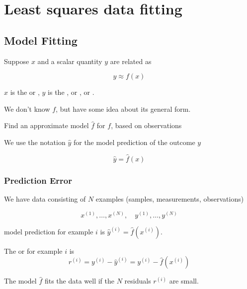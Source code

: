 \chapter{Least squares data fitting}

\section{Model Fitting}

\begin{problem}
  Suppose $ x $ and a scalar quantity $ y $ are related as

$$
y \approx f(x)
$$

$ x $ is the  or , $ y $ is the , or , or .

We don't know $ f $, but have some idea about its general form.

\end{problem}

\begin{definition}
    Find an approximate model $ \hat{f} $ for $ f $, based on observations

    We use the notation $ \hat{y} $ for the model prediction of the outcome $ y $

    $$
    \hat{y}=\hat{f}(x)
    $$
\end{definition}


\subsection{Prediction Error}

We have data consisting of $ N $ examples (samples, measurements, observations)

$$
x^{(1)}, \ldots, x^{(N)}, \quad y^{(1)}, \ldots, y^{(N)}
$$

model prediction for example $ i $ is $ \hat{y}^{(i)}=\hat{f}\left(x^{(i)}\right) $.

\begin{definition}
    The  or  for example $ i $ is
$$
r^{(i)}=y^{(i)}-\hat{y}^{(i)}=y^{(i)}-\hat{f}\left(x^{(i)}\right)
$$
\end{definition}



The model $ \hat{f} $ fits the data well if the $ N $ residuals $ r^{(i)} $ are small.

